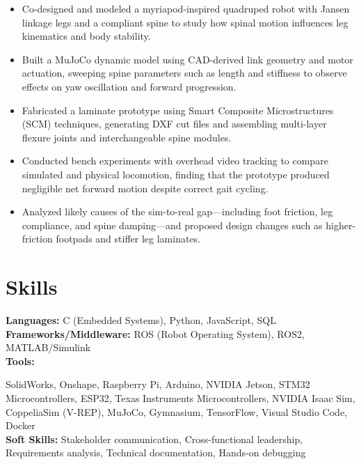 \documentclass[11pt]{article}
\begin{document}
\begin{itemize}[leftmargin=*,noitemsep]
  
  \item Co-designed and modeled a myriapod-inspired quadruped robot with Jansen linkage legs and a compliant spine to study how spinal motion influences leg kinematics and body stability.
  
  \item Built a MuJoCo dynamic model using CAD-derived link geometry and motor actuation, sweeping spine parameters such as length and stiffness to observe effects on yaw oscillation and forward progression.
  
  \item Fabricated a laminate prototype using Smart Composite Microstructures (SCM) techniques, generating DXF cut files and assembling multi-layer flexure joints and interchangeable spine modules.
  
  \item Conducted bench experiments with overhead video tracking to compare simulated and physical locomotion, finding that the prototype produced negligible net forward motion despite correct gait cycling.
  
  \item Analyzed likely causes of the sim-to-real gap—including foot friction, leg compliance, and spine damping—and proposed design changes such as higher-friction footpads and stiffer leg laminates.
  
\end{itemize}


\vspace{2pt}




\section*{Skills}

\textbf{Languages:} C (Embedded Systems), Python, JavaScript, SQL\\
\textbf{Frameworks/Middleware:} ROS (Robot Operating System), ROS2, MATLAB/Simulink\\

\textbf{Tools:}


  

  

  

  

  

SolidWorks, Onshape, Raspberry Pi, Arduino, NVIDIA Jetson, STM32 Microcontrollers, ESP32, Texas Instruments Microcontrollers, NVIDIA Isaac Sim, CoppeliaSim (V-REP), MuJoCo, Gymnasium, TensorFlow, Visual Studio Code, Docker\\




\textbf{Soft Skills:} Stakeholder communication, Cross-functional leadership, Requirements analysis, Technical documentation, Hands-on debugging\\


\vfill
\end{document}
